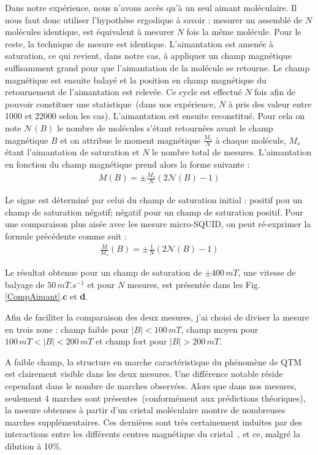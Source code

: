 Dans notre expérience, nous n'avons accès qu'à un seul aimant moléculaire. Il nous faut donc utiliser l'hypothèse ergodique à savoir : mesurer un assemblé de $N$ molécules identique, est équivalent à mesurer $N$ fois la même molécule. Pour le reste, la technique de mesure est identique. L'aimantation est amenée à saturation, ce qui revient, dans notre cas, à appliquer un champ magnétique suffisamment grand pour que l'aimantation de la molécule se retourne. Le champ magnétique est ensuite balayé et la position en champ magnétique du retournement de l'aimantation est relevée. Ce cycle est effectué $N$ fois afin de pouvoir constituer une statistique~(dans nos expérience, $N$ à pris des valeur entre 1000 et 22000 selon les cas). L'aimantation est ensuite reconstitué. Pour cela on note $\mathscr{N}(B)$ le nombre de molécules s'étant retournées avant le champ magnétique $B$ et on attribue le moment magnétique $\frac{M_s}{N}$ à chaque molécule, $M_s$ étant l'aimantation de saturation et $N$ le nombre total de mesures. L'aimantation en fonction du champ magnétique prend alors la forme suivante :
\begin{eqnarray}
M(B) =\pm \frac{M_s}{N}(2\mathscr{N}(B) -1)\nonumber
\end{eqnarray}

Le signe est déterminé par celui du champ de saturation initial : positif pou un champ de saturation négatif; négatif pour un champ de saturation positif. Pour une comparaison plus aisée avec les mesure micro-SQUID, on peut ré-exprimer la formule précédente comme suit :
\begin{eqnarray}
\frac{M}{M_s}(B) =\pm \frac{1}{N} (2\mathscr{N}(B) -1)
\end{eqnarray}

Le résultat obtenue pour un champ de saturation de $\pm 400 \, mT$, une vitesse de balyage de $50\,mT.s^{-1}$ et pour $N$ mesures, est présentée dans les Fig.\ref{CompAimant}.\textbf{c} et \textbf{d}.

Afin de faciliter la comparaison des deux mesures, j'ai choisi de diviser la mesure en trois zone : champ faible pour $|B|< 100\,mT$, champ moyen pour $100\,mT<|B|< 200\,mT$ et champ fort pour $|B| > 200\,mT$.

A faible champ, la structure en marche caractéristique du phénomène de QTM~\cite{Thomas1996,Friedman1996} est clairement visible dans les deux mesures. Une différence notable réside cependant dans le nombre de marches observées. Alors que dans nos mesures, seulement 4 marches sont présentes~(conformément aux prédictions théoriques), la mesure obtenues à partir d'un cristal moléculaire montre de nombreuses marches supplémentaires. Ces dernières sont très certainement induites par des interactions entre les différents centres magnétique du cristal~\cite{Wernsdorfer2002}, et ce, malgré la dilution à 10\%.

